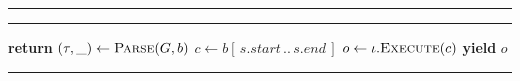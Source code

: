 \documentclass[14pt]{extarticle}
\begin{document}
\vspace*{5mm}%
\noindent
\begin{minipage}{\textwidth}
\hrule\vspace{2pt}\hrule\vspace{4pt}
\begin{algorithmic}[1]
     \State \textbf{return} \EndIf
    \State $(\tau, \_) \gets \Call{Parse}{G, b}$
        \State $c \gets b[\,s.\mathit{start}\,..\,s.\mathit{end}\,]$
        \State $o \gets \iota.\Call{Execute}{c}$
        \State \textbf{yield} $o$
    \EndFor
\EndProcedure
\end{algorithmic}
\vspace{4pt}\hrule
\end{minipage}
\end{document}
